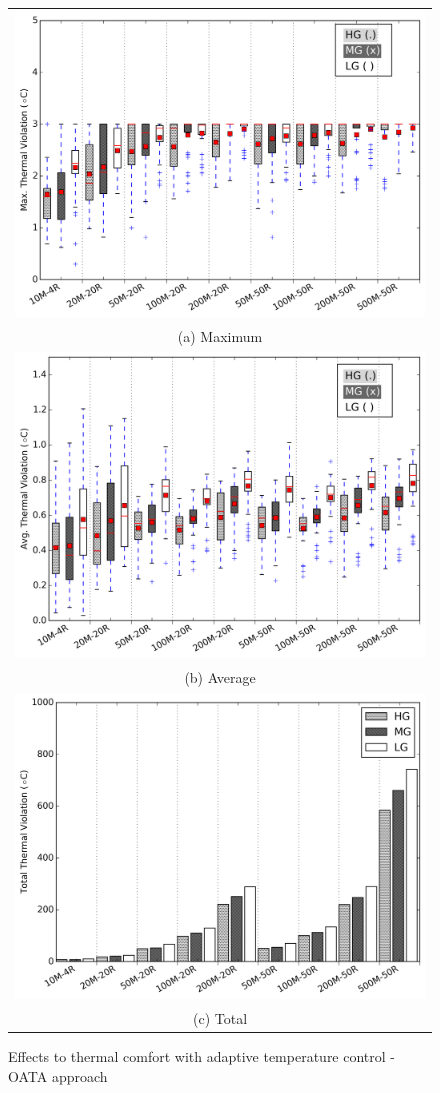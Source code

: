 \begin{figure}
\centering
\begin{tabular}{c}
  \includegraphics[width=0.6\linewidth]{figs/max_thermal_violation_diff_temp_flex_def_vs_oarb_boxplot_oat.png} \\
(a) Maximum \\[6pt]
  \includegraphics[width=0.6\linewidth]{figs/avg_thermal_violation_diff_temp_flex_def_vs_oarb_boxplot_oat.png} \\
(b) Average \\[6pt]
	\includegraphics[width=0.6\linewidth]{figs/total_thermal_violation_diff_temp_flex_def_vs_oarb_oat.png} \\
(c) Total 
\end{tabular}
\caption{Effects to thermal comfort with adaptive temperature control - OATA approach}
\label{fig:atc_ot}
\end{figure}

